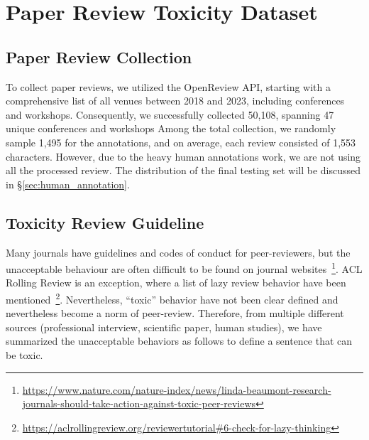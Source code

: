 \section{Paper Review Toxicity Dataset}

\subsection{Paper Review Collection }
To collect paper reviews, we utilized the OpenReview API, starting with a comprehensive list of all venues between 2018 and 2023, including conferences and workshops. 
Consequently, we successfully collected 50,108, spanning 47 unique conferences and workshops 
Among the total collection, we randomly sample 1,495 for the annotations, and 
on average, each review consisted of 1,553 characters. However, due to the heavy human annotations work, we are not using all the processed review. The distribution of the final testing set will be discussed in \S\ref{sec:human_annotation}.

\subsection{Toxicity Review Guideline}
\label{sec:guideline}

Many journals have guidelines and codes of conduct for peer-reviewers,  but the unacceptable behaviour are often difficult to be found on journal websites~\footnote{\url{https://www.nature.com/nature-index/news/linda-beaumont-research-journals-should-take-action-against-toxic-peer-reviews}}. 
ACL Rolling Review is an exception, where a list of lazy review behavior have been mentioned~\footnote{\url{https://aclrollingreview.org/reviewertutorial#6-check-for-lazy-thinking}}. Nevertheless, ``toxic'' behavior have not been clear defined and nevertheless become a norm of peer-review. 
Therefore, from multiple different sources (professional interview, scientific paper, human studies), we have summarized the unacceptable behaviors as follows to define a sentence that can be toxic.  

